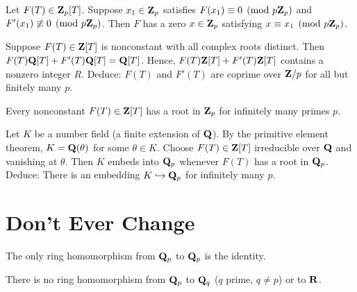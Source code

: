 \begin{prob}\label{prob:115} Let $F(T) \in \mathbf{Z}_p[T]$. Suppose $x_1 \in \mathbf{Z}_p$ satisfies $F(x_1) \equiv 0\pmod{p\mathbf{Z}_p}$ and $F'(x_1)\not\equiv 0\pmod{p\mathbf{Z}_p}$. Then $F$ has a zero $x\in \mathbf{Z}_p$ satisfying $x\equiv x_1\pmod{p\mathbf{Z}_p}$.
\end{prob}


\begin{prob}\label{prob:116} Suppose $F(T) \in \mathbf{Z}[T]$ is nonconstant with all complex roots distinct. Then $F(T) \mathbf{Q}[T] + F'(T) \mathbf{Q}[T] = \mathbf{Q}[T]$. Hence, $F(T)\mathbf{Z}[T] + F'(T) \mathbf{Z}[T]$ contains a nonzero integer $R$.  Deduce: $F(T)$ and $F'(T)$ are coprime over $\mathbf{Z}/p$ for all but finitely many $p$.
\end{prob}

\begin{prob}\label{prob:117} Every nonconstant $F(T) \in \mathbf{Z}[T]$ has a root in $\mathbf{Z}_p$ for infinitely many primes $p$.
\end{prob}

\begin{prob}\label{ex:embedding}\label{prob:118} Let $K$ be a number field (a finite extension of $\mathbf{Q}$). By the primitive element theorem, $K = \mathbf{Q}(\theta)$ for some $\theta\in K$. Choose $F(T) \in \mathbf{Z}[T]$ irreducible over $\mathbf{Q}$ and vanishing at $\theta$. Then $K$ embeds into $\mathbf{Q}_p$ whenever $F(T)$ has a root in $\mathbf{Q}_p$. Deduce: There is an embedding $K \hookrightarrow \mathbf{Q}_p$ for infinitely many $p$.
\end{prob}


\section*{Don't Ever Change}
\begin{prob}\label{prob:onlyhomomorphism} The only ring homomorphism from $\mathbf{Q}_p$ to $\mathbf{Q}_p$ is the identity.
\end{prob}

\begin{prob}\label{prob:nohomomorphism} There is no ring homomorphism from $\mathbf{Q}_p$ to $\mathbf{Q}_q$ ($q$ prime, $q\ne p$) or to $\mathbf{R}$.
\end{prob}

